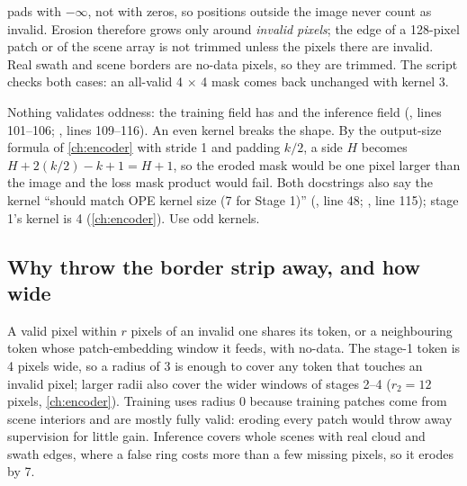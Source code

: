 \begin{sourcenote}
 pads with $-\infty$, not with zeros, so positions outside the image never count as
invalid. Erosion therefore grows only around \emph{invalid pixels}; the edge of a 128-pixel patch or of
the scene array is not trimmed unless the pixels there are invalid. Real swath and scene borders are
no-data pixels, so they are trimmed. The script 
checks both cases: an all-valid 4 $\times$ 4 mask comes back unchanged with kernel 3.
\end{sourcenote}

\begin{sourcenote}
Nothing validates oddness: the training field has  and the inference field 
(, lines 101--106;
, lines 109--116). An even kernel breaks the shape. By the
output-size formula of \cref{ch:encoder} with stride 1 and padding $k/2$, a side $H$ becomes
$H + 2(k/2) - k + 1 = H + 1$, so the eroded mask would be one pixel larger than the image and the loss
mask product would fail. Both docstrings also say the kernel ``should match OPE kernel size (7 for
Stage 1)'' (, line 48; , line 115); stage 1's kernel
is 4 (\cref{ch:encoder}). Use odd kernels.
\end{sourcenote}

\subsection{Why throw the border strip away, and how wide}

A valid pixel within $r$ pixels of an invalid one shares its token, or a neighbouring token whose
patch-embedding window it feeds, with no-data. The stage-1 token is 4 pixels wide, so a radius of 3 is
enough to cover any token that touches an invalid pixel; larger radii also cover the wider windows of
stages 2--4 ($r_2 = 12$ pixels, \cref{ch:encoder}). Training uses radius 0 because training patches
come from scene interiors and are mostly fully valid: eroding every patch would throw away supervision
for little gain. Inference covers whole scenes with real cloud and swath edges, where a false ring costs
more than a few missing pixels, so it erodes by 7.

